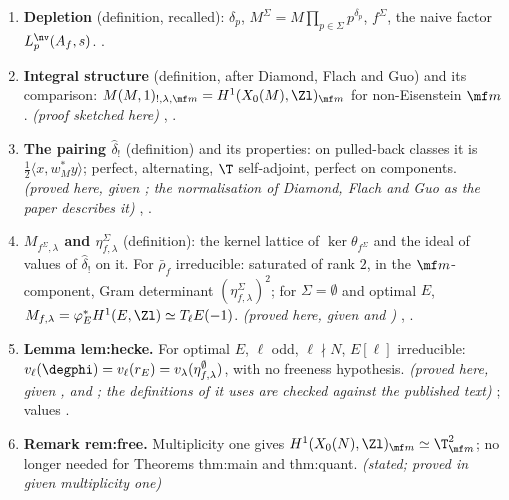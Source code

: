 \begin{enumerate}[label=\textbf{\thechapter.\arabic*}]
$d\,v(\eta)\ge v(\Delta)$, with equality if $L$ is free over $\T$. \emph{(proved here, given )} ; Commentary on the paper's statement
; hypotheses ; test cases .
\item \textbf{Depletion} (definition, recalled): $\delta_p$, $M^\Sigma=M\prod_{p\in\Sigma}p^{\delta_p}$, $f^\Sigma$, the naive factor $L^{\nv}_p(A_f,s)$. .
\item \textbf{Integral structure} (definition, after Diamond, Flach and Guo) and its comparison: $M(M,1)_{!,\lambda,\mf m}=H^1(X_0(M),\Zl)_{\mf m}$ for non-Eisenstein $\mf m$. \emph{(proof sketched here)}
, .
\item \textbf{The pairing $\hat\delta_!$} (definition) and its properties: on pulled-back classes it is $\frac12\langle x,w_M^*y\rangle$; perfect, alternating, $\T$ self-adjoint, perfect on components. \emph{(proved here, given
; the normalisation of Diamond, Flach and Guo as the paper describes it)} , .
\item \textbf{$M_{f^\Sigma,\lambda}$ and $\eta^\Sigma_{f,\lambda}$} (definition): the kernel lattice of $\ker\theta_{f^\Sigma}$ and the ideal of values of $\hat\delta_!$ on it. For $\bar\rho_f$ irreducible: saturated of rank $2$, in the
$\mf m$-component, Gram determinant $(\eta^\Sigma_{f,\lambda})^2$; for $\Sigma=\emptyset$ and optimal $E$, $M_{f,\lambda}=\varphi_E^*H^1(E,\Zl)\simeq T_\ell E(-1)$. \emph{(proved here, given  and
)} , .
\item \textbf{Lemma lem:hecke.} For optimal $E$, $\ell$ odd, $\ell\nmid N$, $E[\ell]$ irreducible: $v_\ell(\degphi)=v_\ell(r_E)=v_\lambda(\eta^\emptyset_{f,\lambda})$, with no freeness hypothesis. \emph{(proved here, given
\cite[Theorem 2.2]{ARS12},  and ; the definitions of \cite{DFG04} it uses are checked against the published text)}
; values .
\item \textbf{Remark rem:free.} Multiplicity one gives $H^1(X_0(N),\Zl)_{\mf m}\simeq\T_{\mf m}^2$; no longer needed for Theorems thm:main and thm:quant. \emph{(stated; proved in  given multiplicity one)}

\end{enumerate}
